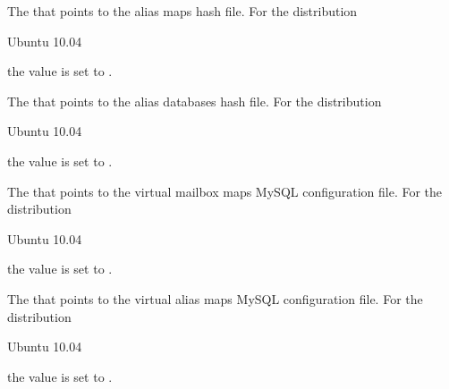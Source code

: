The  that points to the alias maps hash file.
For the distribution
\begin{inparaitem}
\item[\TheDistribution{ubuntu}] Ubuntu 10.04
\end{inparaitem}
the value is set to .


The  that points to the alias databases hash file.
For the distribution
\begin{inparaitem}
\item[\TheDistribution{ubuntu}] Ubuntu 10.04
\end{inparaitem}
the value is set to .


The  that points to the virtual mailbox maps MySQL configuration file.
For the distribution
\begin{inparaitem}
\item[\TheDistribution{ubuntu}] Ubuntu 10.04
\end{inparaitem}
the value is set to .


The  that points to the virtual alias maps MySQL configuration file.
For the distribution
\begin{inparaitem}
\item[\TheDistribution{ubuntu}] Ubuntu 10.04
\end{inparaitem}
the value is set to .


